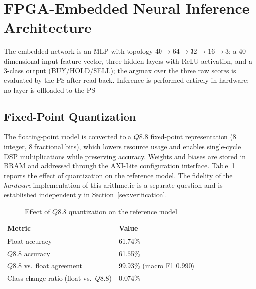 \documentclass[final,5p,times,twocolumn]{elsarticle}
\begin{document}
\section{FPGA-Embedded Neural Inference Architecture}
The embedded network is an MLP with topology
$40\!\rightarrow\!64\!\rightarrow\!32\!\rightarrow\!16\!\rightarrow\!3$: a
40-dimensional input feature vector, three hidden layers with ReLU activation,
and a 3-class output (BUY/HOLD/SELL); the argmax over the three raw scores is
evaluated by the PS after read-back.
Inference is performed entirely in hardware; no layer is offloaded to the PS.

\subsection{Fixed-Point Quantization}
The floating-point model is converted to a $Q8.8$ fixed-point representation
(8 integer, 8 fractional bits), which lowers resource usage and enables
single-cycle DSP multiplications while preserving accuracy. Weights and biases
are stored in BRAM and addressed through the AXI-Lite configuration interface.
Table~\ref{tab:quantization_eval} reports the effect of quantization on the
reference model. The fidelity of the \emph{hardware} implementation of this
arithmetic is a separate question and is established independently in
Section~\ref{sec:verification}.

\begin{table}[htbp]
\centering
\caption{Effect of $Q8.8$ quantization on the reference model}
\label{tab:quantization_eval}
\begin{tabular}{p{3.1cm} p{4.3cm}}
\toprule
Metric & Value \\
\midrule
Float accuracy & 61.74\% \\
$Q8.8$ accuracy & 61.65\% \\
$Q8.8$ vs.\ float agreement & 99.93\% (macro F1 0.990) \\
Class change ratio (float vs.\ $Q8.8$) & 0.074\% \\
\bottomrule
\end{tabular}
\end{table}
\end{document}
